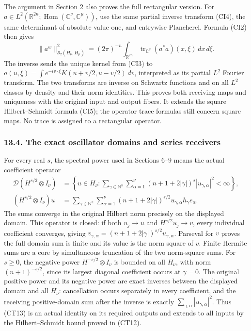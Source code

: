 \documentclass[
  11pt,
]{article}
\begin{document}
The argument in Section 2 also proves the full rectangular version. For
\(a\in L^2(\mathbb R^{2n};\operatorname{Hom}(\mathbb C^\nu,\mathbb C^\mu))\),
use the same partial inverse transform (CI4), the same determinant of
absolute value one, and entrywise Plancherel. Formula (CI2) then gives
\[
 \|a^w\|_{\mathcal S_2(H_\nu,H_\mu)}^2
  =(2\pi)^{-n}\int_{\mathbb R^{2n}}
               \operatorname{tr}_{\mathbb C^\nu}(a^*a)(x,\xi)
                                                     \,dx\,d\xi.
                                                               \tag{TR1}
\] The inverse sends the unique kernel from (CI3) to
\(a(u,\xi)=\int e^{-iv\cdot\xi}K(u+v/2,u-v/2)\,dv\), interpreted as its
partial \(L^2\) Fourier transform. The two transforms are inverse on
Schwartz functions and on all \(L^2\) classes by density and their norm
identities. This proves both receiving maps and uniqueness with the
original input and output fibers. It extends the square Hilbert--Schmidt
formula (CI5); the operator trace formulas still concern square maps. No
trace is assigned to a rectangular operator.

\subsubsection{13.4. The exact oscillator domains and series
receivers}\label{the-exact-oscillator-domains-and-series-receivers}

For every real \(s\), the spectral power used in Sections 6--9 means the
actual coefficient operator \[
 \begin{split}
 \mathcal D(H^{s/2}\otimes I_\nu)
 &=\left\{u\in H_\nu:
      \sum_{\gamma\in\mathbb N^n}\sum_{\alpha=1}^{\nu}
           (n+1+2|\gamma|)^s|u_{\gamma,\alpha}|^2<\infty\right\},\\
 (H^{s/2}\otimes I_\nu)u
 &=\sum_{\gamma\in\mathbb N^n}\sum_{\alpha=1}^{\nu}
       (n+1+2|\gamma|)^{s/2}u_{\gamma,\alpha}h_\gamma e_\alpha.
 \end{split}                                                   \tag{TO1}
\] The sums converge in the original Hilbert norm precisely on the
displayed domain. This operator is closed: if both \(u_j\to u\) and
\(H^{s/2}u_j\to v\), every individual coefficient converges, giving
\(v_{\gamma,\alpha}=(n+1+2|\gamma|)^{s/2}u_{\gamma,\alpha}\). Parseval
for \(v\) proves the full domain sum is finite and its value is the norm
square of \(v\). Finite Hermite sums are a core by simultaneous
truncation of the two norm-square sums. For \(s\geq0\), the negative
power \(H^{-s/2}\otimes I_\nu\) is bounded on all \(H_\nu\), with norm
\((n+1)^{-s/2}\), since its largest diagonal coefficient occurs at
\(\gamma=0\). The original positive power and its negative power are
exact inverses between the displayed domain and all \(H_\nu\):
cancellation occurs separately in every coefficient, and the receiving
positive-domain sum after the inverse is exactly
\(\sum_{\gamma,\alpha}|u_{\gamma,\alpha}|^2\). Thus (CT13) is an actual
identity on its required outputs and extends to all inputs by the
Hilbert--Schmidt bound proved in (CT12).
\end{document}
